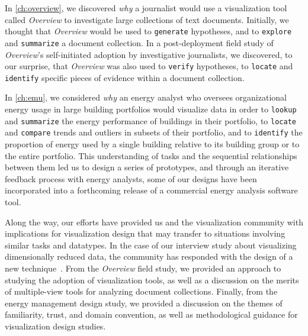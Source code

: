 In \autoref{ch:overview}, we discovered {\it why} a journalist would use a visualization tool called {\it Overview} to investigate large collections of text documents. 
Initially, we thought that {\it Overview} would be used to {\tt generate} hypotheses, and to {\tt explore} and {\tt summarize} a document collection.
In a post-deployment field study of {\it Overview}'s self-initiated adoption by investigative journalists, we discovered, to our surprise, that {\it Overview} was also used to {\tt verify} hypotheses, to {\tt locate} and {\tt identify} specific pieces of evidence within a document collection.

In \autoref{ch:emu}, we considered {\it why} an energy analyst who oversees organizational energy usage in large building portfolios would visualize data in order to {\tt lookup} and {\tt summarize} the energy performance of buildings in their portfolio, to {\tt locate} and {\tt compare} trends and outliers in subsets of their portfolio, and to {\tt identify} the proportion of energy used by a single building relative to its building group or to the entire portfolio.
This understanding of tasks and the sequential relationships between them led us to design a series of prototypes, and through an iterative feedback process with energy analysts, some of our designs have been incorporated into a forthcoming release of a commercial energy analysis software tool.

Along the way, our efforts have provided us and the visualization community with implications for visualization design that may transfer to situations involving similar tasks and datatypes.
In the case of our interview study about visualizing dimensionally reduced data, the community has responded with the design of a new technique~\cite{Stahnke2015}.
From the {\it Overview} field study, we provided an approach to studying the adoption of visualization tools, as well as a discussion on the merits of multiple-view tools for analyzing document collections.
Finally, from the energy management design study, we provided a discussion on the themes of familiarity, trust, and domain convention, as well as methodological guidance for visualization design studies.

